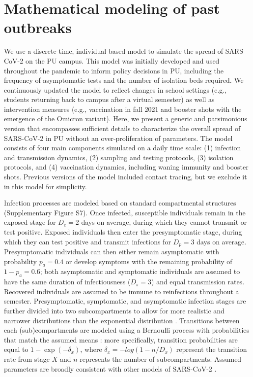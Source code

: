 \documentclass[12pt]{article}
\begin{document}
\section*{Mathematical modeling of past outbreaks}

We use a discrete-time, individual-based model to simulate the spread of SARS-CoV-2 on the PU campus.
This model was initially developed and used throughout the pandemic to inform policy decisions in PU, including the frequency of asymptomatic tests and the number of isolation beds required.
We continuously updated the model to reflect changes in school settings (e.g., students returning back to campus after a virtual semester) as well as intervention measures (e.g., vaccination in fall 2021 and booster shots with the emergence of the Omicron variant).
Here, we present a generic and parsimonious version that encompasses sufficient details to characterize the overall spread of SARS-CoV-2 in PU without an over-proliferation of parameters.
The model consists of four main components simulated on a daily time scale: (1) infection and transmission dynamics, (2) sampling and testing protocols, (3) isolation protocols, and (4) vaccination dynamics, including waning immunity and booster shots.
Previous versions of the model included contact tracing, but we exclude it in this model for simplicity.

Infection processes are modeled based on standard compartmental structures (Supplementary Figure S7).
Once infected, susceptible individuals remain in the exposed stage for $D_e = 2$ days on average, during which they cannot transmit or test positive. 
Exposed individuals then enter the presymptomatic stage, during which they can test positive and transmit infections for $D_p = 3$ days on average.
Presymptomatic individuals can then either remain asymptomatic with probability $p_a = 0.4$ or develop symptoms with the remaining probability of $1-p_a = 0.6$; both asymptomatic and symptomatic individuals are assumed to have the same duration of infectiousness ($D_s=3$) and equal transmission rates.
Recovered individuals are assumed to be immune to reinfections throughout a semester.
Presymptomatic, symptomatic, and asymptomatic infection stages are further divided into two subcompartments to allow for more realistic and narrower distributions than the exponential distribution \citep{brett2020transmission}.
Transitions between each (sub)compartments are modeled using a Bernoulli process with probabilities that match the assumed means \citep{he2010plug}:
more specifically, transition probabilities are equal to $1 - \exp(-\delta_x)$, where $\delta_x = -log(1-n/D_x)$ represent the transition rate from stage $X$ and $n$ represents the number of subcompartments.
Assumed parameters are broadly consistent with other models of SARS-CoV-2 \citep{brett2020transmission,lavezzo2020suppression}.
\end{document}

